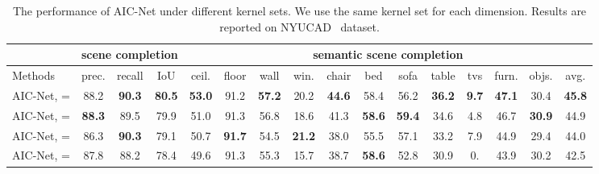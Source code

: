\begin{table*}[t]
\begin{center}
\scalebox{0.88}
{
\begin{tabular} {l |c c c|c c c c c c c c c c c|c} \hline
 &  \multicolumn{3}{c|}{scene completion} & \multicolumn{12}{c}{semantic scene completion} \\ 
\hline
Methods  & prec. & recall & IoU & \cellcolor{rgb1}ceil. & \cellcolor{rgb2}floor & \cellcolor{rgb3}wall & \cellcolor{rgb4}win. & \cellcolor{rgb5}chair & \cellcolor{rgb6}bed & \cellcolor{rgb7}sofa & \cellcolor{rgb8}table & \cellcolor{rgb9}tvs & \cellcolor{rgb10}furn. & \cellcolor{rgb11}objs. & avg. \\ 
\hline
\hline
AIC-Net, = & 88.2 & {\bfseries90.3} & {\bfseries 80.5} & {\bfseries53.0}  & 91.2 & {\bfseries 57.2} & 20.2 & {\bfseries 44.6} & 58.4 & 56.2 & {\bfseries 36.2}  & {\bfseries9.7} & {\bfseries 47.1} & 30.4 & {\bfseries 45.8} 
\\

\hline
AIC-Net, = & {\bfseries88.3} & 89.5 & 79.9 & 51.0 & 91.3 & 56.8 & 18.6 &  41.3 & {\bfseries58.6} & {\bfseries 59.4} & 34.6  & 4.8 & 46.7 & {\bfseries 30.9} & 44.9  \\
AIC-Net, = & 86.3 & {\bfseries 90.3} & 79.1 & 50.7 & {\bfseries 91.7} &54.5 &{\bfseries 21.2} & 38.0 &  55.5& 57.1 &33.2&  7.9& 44.9& 29.4 & 44.0 \\

AIC-Net, = & 87.8 & 88.2 & 78.4 & 49.6 & 91.3 & 55.3 & 15.7 & 38.7 & {\bfseries 58.6} & 52.8 & 30.9 &  0. &  43.9 & 30.2 & 42.5 \\
\hline


\end{tabular}
}  \caption{The performance of AIC-Net under different kernel sets. We use the same kernel set  for each dimension. Results are reported on NYUCAD~\cite{zheng2013beyond} dataset.}
\vspace{-0.3cm}
\label{tab:kernels}
\end{center}
\end{table*}
 
